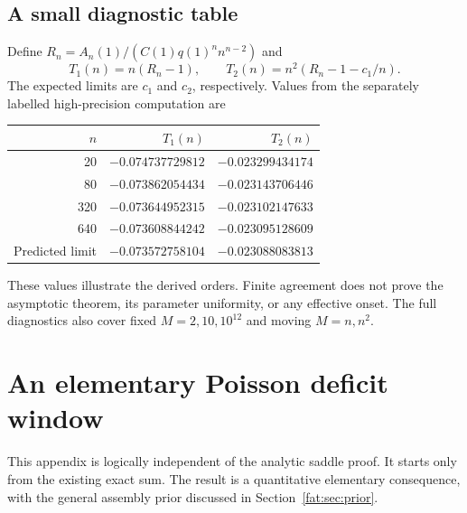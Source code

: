 \documentclass[11pt,letterpaper]{article}
\numberwithin{equation}{section}
\theoremstyle{remark}\newtheorem{remark}[theorem]{Remark}
\begin{document}
\subsection{A small diagnostic table}
Define $R_n=A_n(1)/(C(1)q(1)^n n^{n-2})$ and
\[
 T_1(n)=n(R_n-1),\qquad T_2(n)=n^2(R_n-1-c_1/n).
\]
The expected limits are $c_1$ and $c_2$, respectively. Values from the separately labelled high-precision computation are
\begin{center}
\begin{tabular}{r rr}
\toprule
$n$ & $T_1(n)$ & $T_2(n)$\\
\midrule
20 & $-0.074737729812$ & $-0.023299434174$\\
80 & $-0.073862054434$ & $-0.023143706446$\\
320 & $-0.073644952315$ & $-0.023102147633$\\
640 & $-0.073608844242$ & $-0.023095128609$\\
\midrule
Predicted limit & $-0.073572758104$ & $-0.023088083813$\\
\bottomrule
\end{tabular}
\end{center}
These values illustrate the derived orders. Finite agreement does not prove the asymptotic theorem, its parameter uniformity, or any effective onset. The full diagnostics also cover fixed $M=2,10,10^{12}$ and moving $M=n,n^2$.

\appendix
\section{An elementary Poisson deficit window}\label{fat:sec:poisson}
This appendix is logically independent of the analytic saddle proof. It starts only from the existing exact sum. The result is a quantitative elementary consequence, with the general assembly prior discussed in Section~\ref{fat:sec:prior}.
\end{document}
